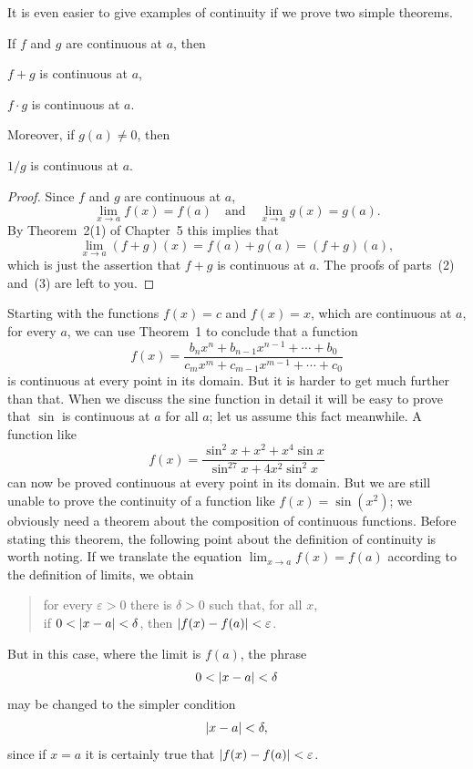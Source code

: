 It is even easier to give examples of continuity if we prove two simple
theorems.

\begin{theorem}
If $f$ and $g$ are continuous at $a$, then
\begin{steps}
\item $f + g$ is continuous at $a$,
\item $f \cdot g$ is continuous at $a$.
\end{steps}
Moreover, if $g(a) \neq 0$, then
\begin{steps}[start=3]
\item $1/g$ is continuous at $a$.
\end{steps}
\end{theorem}

\begin{proof}
Since $f$ and $g$ are continuous at $a$,
\[
\lim_{x \to a} f(x) = f(a)
\quad\text{and}\quad
\lim_{x \to a} g(x) = g(a).
\]
By Theorem~2(1) of Chapter~5 this implies that
\[
\lim_{x \to a} (f + g)(x) = f(a) + g(a) = (f + g)(a),
\]
which is just the assertion that $f + g$ is continuous at $a$. The
proofs of parts~(2) and~(3) are left to you.
\end{proof}

Starting with the functions $f(x) = c$ and $f(x) = x$, which are
continuous at $a$, for every $a$, we can use Theorem~1 to conclude that
a function
\[
f(x) = \frac{b_n x^n + b_{n-1} x^{n-1} + \cdots + b_0}
{c_m x^m + c_{m-1} x^{m-1} + \cdots + c_0}
\]
is continuous at every point in its domain. But it is harder to get
much further than that. When we discuss the sine function in detail it
will be easy to prove that $\sin$ is continuous at $a$ for all $a$; let
us assume this fact meanwhile. A function like
\[
f(x) = \frac{\sin^2 x + x^2 + x^4 \sin x}
{\sin^{27} x + 4x^2 \sin^2 x}
\]
can now be proved continuous at every point in its domain. But we are
still unable to prove the continuity of a function like
$f(x) = \sin(x^2)$; we obviously need a theorem about the composition of
continuous functions. Before stating this theorem, the following point
about the definition of continuity is worth noting. If we translate the
equation $\lim_{x \to a} f(x) = f(a)$ according to the definition of
limits, we obtain
\begin{quote}
for every $\varepsilon > 0$ there is $\delta > 0$ such that, for all
$x$,\\
if $0 < \lvert x - a\rvert < \delta$, then $\lvert f(x) - f(a)\rvert < \varepsilon$.
\end{quote}
But in this case, where the limit is $f(a)$, the phrase
\[
0 < \lvert x - a\rvert < \delta
\]
may be changed to the simpler condition
\[
\lvert x - a\rvert < \delta,
\]
since if $x = a$ it is certainly true that
$\lvert f(x) - f(a)\rvert < \varepsilon$.

